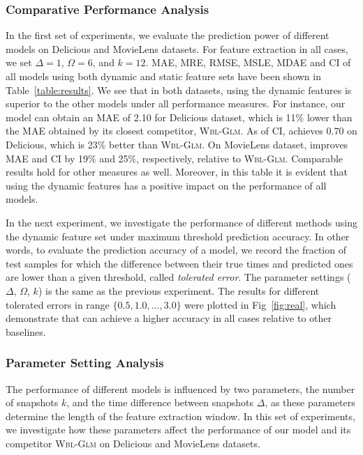 \subsubsection{Comparative Performance Analysis}
In the first set of experiments, we evaluate the prediction power of different models on Delicious and MovieLens datasets. For feature extraction in all cases, we set $\Delta=1$, $\Omega=6$, and $k=12$. MAE, MRE, RMSE, MSLE, MDAE and CI of all models using both dynamic and static feature sets have been shown in Table~\ref{table:results}. We see that in both datasets, \npglm using the dynamic features is superior to the other models under all performance measures. For instance, our model \npglm can obtain an MAE of 2.10 for Delicious dataset, which is 11\% lower than the MAE obtained by its closest competitor, \textsc{Wbl-Glm}. As of CI, \npglm achieves 0.70 on Delicious, which is 23\% better than \textsc{Wbl-Glm}. 
On MovieLens dataset, \npglm improves MAE and CI by 19\% and 25\%, respectively, relative to \textsc{Wbl-Glm}. Comparable results hold for other measures as well. Moreover, in this table it is evident that using the dynamic features has a positive impact on the performance of all models.

In the next experiment, we investigate the performance of different methods using the dynamic feature set under maximum threshold prediction accuracy. In other words, to evaluate the prediction accuracy of a model, we record the fraction of test samples for which the difference between their true times and predicted ones are lower than a given threshold, called \emph{tolerated error}. The parameter settings ($\Delta$, $\Omega$, $k$) is the same as the previous experiment. The results for different tolerated errors in range $\{0.5, 1.0, \dots, 3.0\}$ were plotted in Fig~\ref{fig:real}, which demonstrate that \npglm can achieve a higher accuracy in all cases relative to other baselines.


\subsubsection{Parameter Setting Analysis}
The performance of different models is influenced by two parameters, the number of snapshots $k$, and the time difference between snapshots $\Delta$, as these parameters determine the length of the feature extraction window. In this set of experiments, we investigate how these parameters affect the performance of our model \npglm and its competitor \textsc{Wbl-Glm} on Delicious and MovieLens datasets. 

